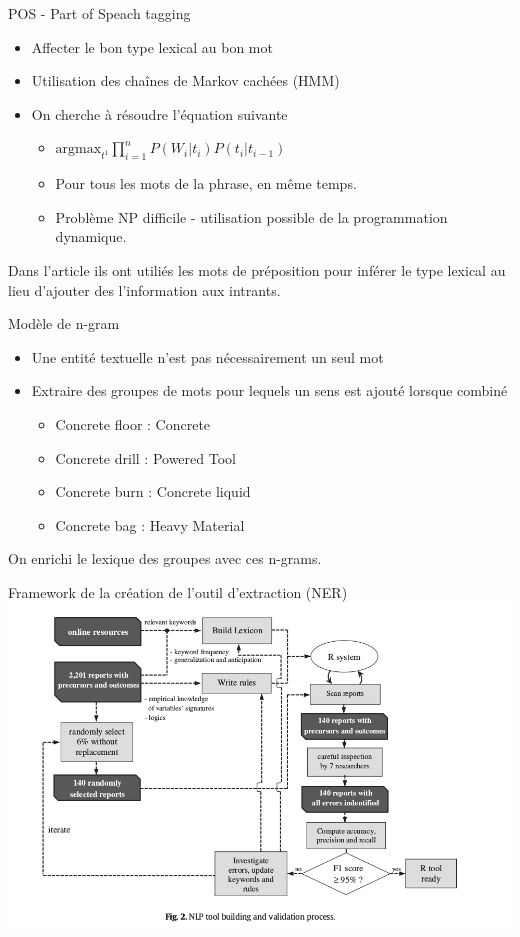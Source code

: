 \begin{frame}	
	POS - Part of Speach tagging
	\begin{itemize}
		\item Affecter le bon type lexical au bon mot
		\item Utilisation des chaînes de Markov cachées (HMM)
		\item On cherche à résoudre l'équation suivante
		\begin{itemize}
			\item $\textrm{argmax}_{t^1}  \prod_{i=1}^{n}  P(W_i|t_i) P(t_i|t_{i-1}) $
			\item Pour tous les mots de la phrase, en même temps.
			\item Problème NP difficile - utilisation possible de la programmation dynamique.
		\end{itemize}
	\end{itemize}
	Dans l'article ils ont utiliés les mots de préposition pour inférer le type lexical au lieu d'ajouter des l'information aux intrants.
\end{frame}

\begin{frame}	
	Modèle de n-gram
	\begin{itemize}
		\item Une entité textuelle n'est pas nécessairement un seul mot
		\item Extraire des groupes de mots pour lequels un sens est ajouté lorsque combiné
		\begin{itemize}
			\item Concrete floor : Concrete
			\item Concrete drill : Powered Tool
			\item Concrete burn : Concrete liquid 
			\item Concrete bag : Heavy Material
		\end{itemize}	
	\end{itemize}
	On enrichi le lexique des groupes avec ces n-grams.
\end{frame}

\begin{frame}	
	Framework de la création de l'outil d'extraction (NER)
	\includegraphics[width=\paperwidth]{rtool_training_framework}
\end{frame}



